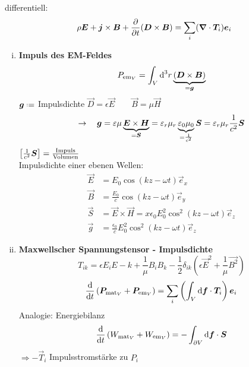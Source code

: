 \noindent
differentiell:
\begin{equation*}
\rho \bm{E} + \bm{j} \times \bm{B} + \frac{\partial }{\partial t} (\bm{D} \times \bm{B}) = \sum_i (\bm{\nabla} \cdot \bm{T}_i) \bm{e}_i
\end{equation*}
\begin{enumerate}[i)]
	\item \textbf{Impuls des EM-Feldes}
	\begin{equation*}
	P_{\textrm{em}_V} = \int_V \textrm{d}^3 r \underbrace{(\bm{D} \times \bm{B})}_{=\bm{g}}
	\end{equation*}
	$ \vec{g} \defeq $ Impulsdichte
	$ \vec{D} = \epsilon \vec{E} \qquad \vec{B} = \mu \vec{H} $
	\begin{equation*}
	\rightarrow \quad \bm{g} = \varepsilon \mu \underbrace{\bm{E} \times \bm{H}}_{=\bm{S}} = \varepsilon_r \mu_r \underbrace{\varepsilon_0 \mu_0}_{= \frac{1}{c^2}} \bm{S} = \varepsilon_r \mu_r \frac{1}{c^2} \bm{S}
	\end{equation*}
	$ \left[\frac{1}{c^2} \bm{S}\right] = \frac{\textrm{Impuls}}{\textrm{Volumen}} $\\[10pt]
	Impulsdichte einer ebenen Wellen:
	\begin{align*}
	\vec{E} &= E_0 \cos\left(kz - \omega t\right) \vec{e}_x\\
	\vec{B} &= \frac{E_0}{c} \cos\left(kz - \omega t\right) \vec{e}_y\\
	\vec{S} &= \vec{E} \times \vec{H} = x \epsilon_0 E_0^2 \cos^2(kz - \omega t) \vec{e}_z\\
	\vec{g} &= \frac{\epsilon_0}{c} E_0^2 \cos^2(kz - \omega t) \vec{e}_z
	\end{align*}
	\item \textbf{Maxwellscher Spannungstensor - Impulsdichte}
	\begin{equation*}
	T_{ik} = \epsilon E_i E-k + \frac{1}{\mu} B_i B_k - \frac{1}{2} \delta_{ik} \left(\epsilon \vec{E}^2 + \frac{1}{\mu} \vec{B^2}\right)
	\end{equation*}
	\begin{equation*}
	\frac{\textrm{d} }{\textrm{d} t} \left(\bm{P}_{\textrm{mat}_V} + \bm{P}_{\textrm{em}_V}\right) = \sum_i \left(\int_V \textrm{d}\bm{f} \cdot \bm{T}_i \right)\bm{e}_i
	\end{equation*}
	Analogie: Energiebilanz
	\begin{equation*}
	\frac{\textrm{d} }{\textrm{d} t} \left(W_{\textrm{mat}_V} + W_{\textrm{em}_V}\right) = - \int_{\partial V} \textrm{d} \bm{f} \cdot \bm{S}
	\end{equation*}
	$ \Rightarrow - \vec{T}_i $ Impulsstromstärke zu $ P_i $\\

\end{enumerate}
